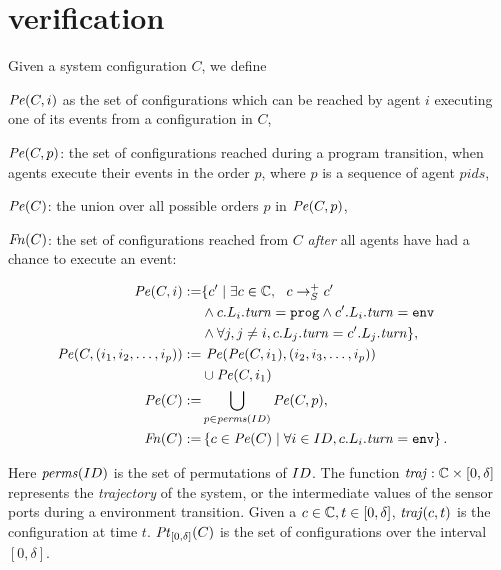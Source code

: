 \section{verification}
\label{sec:verification}
Given a system configuration $C$, we define
 \begin{inparaenum}[(i)]
     \item$\mathit{Pe}(C,i)$ as the set of configurations which can be reached by agent $i$ executing one of its events from a configuration in $C$,
     \item$\mathit{Pe}(C,p)$: the set of configurations reached during a program transition, when agents execute their events in the order $p$, where $p$ is a sequence of agent $\mathit{pids}$,
     \item $\mathit{Pe}(C)$: the union over all possible orders $p$ in $\mathit{Pe}(C,p)$,
     \item$\mathit{Fn}(C)$: the set of configurations reached from $C$ \emph{after} all agents have had a chance to execute an event: \end{inparaenum}
\vspace{1mm}
\begin{mdframed}
\footnotesize
\begin{align*}
\Post(C,i) :=& \{ c^\prime\mid \exists c\in \pwg,  \ \ c\rightarrow_{S}^{+} c^\prime  \\
                  &\wedge c.L_i.\turn = \prog \wedge c^\prime.L_i.\turn = \env & \\
                  & \wedge \forall j, j\neq i, c.L_j.\turn = c^\prime.L_j.\turn \},\\
\Post(C,(i_1,i_2,\ldots ,i_p)) := & \ \Post(\Post(C,i_1),(i_2,i_3,\ldots,i_p))\\ & \cup \Post(C,i_1)\\
\Post(C) :=& \bigcup_{p\in \mathit{perms}(\UINS)} \Post(C,p), \\
\Final(C) :=& \left\{ c\in \Post(C)\mid \forall i \in \UINS, c.L_i.\turn = \env \right\}.
\end{align*}
\end{mdframed}

Here $\mathit{perms}(ID)$ is the set of permutations of $ID$.
The function $\mathit{traj}: \mathbb{C} \times \left[0,\delta\right]$ represents the \emph{trajectory} of the system, or the intermediate values of the sensor ports during a environment transition.
%
Given a $c\in \mathbb{C}, t\in \left[0,\delta\right]$, $\mathit{traj}(c,t)$ is the configuration at time $t$. $\mathit{Pt}_{[0,\delta]}(C)$ is  the set of configurations over the interval $[0,\delta]$.

